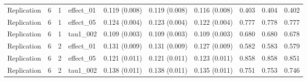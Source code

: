 {\begin{longtable}{lccl ccc ccc}
Replication & 6 & 1 & effect\_01 & 0.119 (0.008) & 0.119 (0.008) & 0.116 (0.008) & 0.403 & 0.404 & 0.402\\
Replication & 6 & 1 & effect\_05 & 0.124 (0.004) & 0.123 (0.004) & 0.122 (0.004) & 0.777 & 0.778 & 0.777\\
Replication & 6 & 1 & tau1\_002 & 0.109 (0.003) & 0.109 (0.003) & 0.109 (0.003) & 0.680 & 0.680 & 0.678\\
Replication & 6 & 2 & effect\_01 & 0.131 (0.009) & 0.131 (0.009) & 0.127 (0.009) & 0.582 & 0.583 & 0.579\\
Replication & 6 & 2 & effect\_05 & 0.121 (0.011) & 0.121 (0.011) & 0.123 (0.011) & 0.858 & 0.858 & 0.851\\
Replication & 6 & 2 & tau1\_002 & 0.138 (0.011) & 0.138 (0.011) & 0.135 (0.011) & 0.751 & 0.753 & 0.746\\
\end{longtable}}
